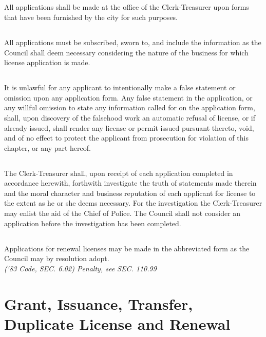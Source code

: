 \subsection{}
All applications shall be made at the office of the Clerk-Treasurer upon forms that have been furnished by the city for such purposes.
\subsection{}
All applications must be subscribed, sworn to, and include the information as the Council shall deem necessary considering the nature of the business for which license application is made.
\subsection{}
It is unlawful for any applicant to intentionally make a false statement or omission upon any application form.  Any false statement in the application, or any willful omission to state any information called for on the application form, shall, upon discovery of the falsehood work an automatic refusal of license, or if already issued, shall render any license or permit issued pursuant thereto, void, and of no effect to protect the applicant from prosecution for violation of this chapter, or any part hereof.
\subsection{}
The Clerk-Treasurer shall, upon receipt of each application completed in accordance herewith, forthwith investigate the truth of statements made therein and the moral character and business reputation of each applicant for license to the extent as he or she deems necessary.  For the investigation the Clerk-Treasurer may enlist the aid of the Chief of Police.  The Council shall not consider an application before the investigation has been completed.
\subsection{}
Applications for renewal licenses may be made in the abbreviated form as the Council may by resolution adopt.\\
\emph{(‘83 Code, SEC. 6.02)  Penalty, see SEC. 110.99}

\section{Grant, Issuance, Transfer, Duplicate License and Renewal}
